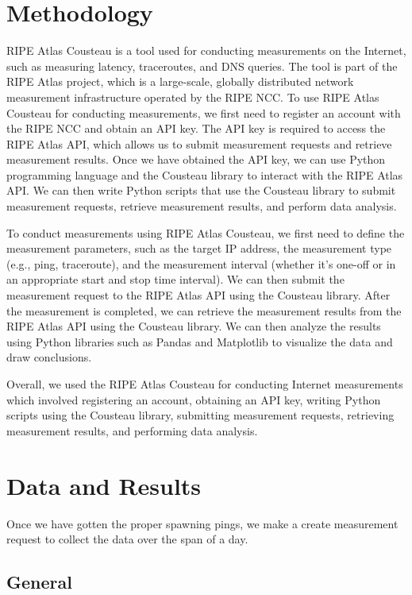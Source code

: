 \documentclass[acmsmall]{acmart}
\begin{document}
\section{Methodology}
RIPE Atlas Cousteau is a tool used for conducting measurements on the Internet, such as measuring latency, traceroutes, and DNS queries. The tool is part of the RIPE Atlas project, which is a large-scale, globally distributed network measurement infrastructure operated by the RIPE NCC. To use RIPE Atlas Cousteau for conducting measurements, we first need to register an account with the RIPE NCC and obtain an API key. The API key is required to access the RIPE Atlas API, which allows us to submit measurement requests and retrieve measurement results. Once we have obtained the API key, we can use Python programming language and the Cousteau library to interact with the RIPE Atlas API. We can then write Python scripts that use the Cousteau library to submit measurement requests, retrieve measurement results, and perform data analysis.

To conduct measurements using RIPE Atlas Cousteau, we first need to define the measurement parameters, such as the target IP address, the measurement type (e.g., ping, traceroute), and the measurement interval (whether it’s one-off or in an appropriate start and stop time interval). We can then submit the measurement request to the RIPE Atlas API using the Cousteau library. After the measurement is completed, we can retrieve the measurement results from the RIPE Atlas API using the Cousteau library. We can then analyze the results using Python libraries such as Pandas and Matplotlib to visualize the data and draw conclusions.

Overall, we used the RIPE Atlas Cousteau for conducting Internet measurements which  involved registering an account, obtaining an API key, writing Python scripts using the Cousteau library, submitting measurement requests, retrieving measurement results, and performing data analysis.

\section{Data and Results}
Once we have gotten the proper spawning pings, we make a create measurement request to collect the data over the span of a day. 

\subsection{General}
\end{document}
